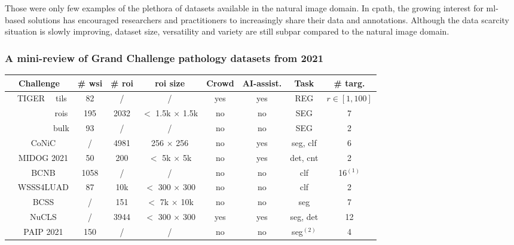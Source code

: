 Those were only few examples of the plethora of datasets available in the natural image domain. In \acrlong{cpath}, the growing interest for \acrshort{ml}-based solutions has encouraged researchers and practitioners to increasingly share their data and annotations. Although the data scarcity situation is slowly improving, dataset size, versatility and variety are still subpar compared to the natural image domain.

\subsubsection{A mini-review of Grand Challenge pathology datasets from 2021}
\label{sssec:backdp:grandchallenge}

\begin{table}
  \centering
  \footnotesize
  \begin{tabular}{|ccc|ccccccc|}
    \hline
    \multicolumn{3}{|c|}{Challenge} & \# \acrshort{wsi} & \# \acrshort{roi} & \acrshort{roi} size & Crowd & AI-assist. & Task & \# targ. \\
    \hline
    \multirow{3}{*}{\cite{vanrijthoven2021tiger}} & \multirow{3}{*}{TIGER} & tils & 82 & / &  / & yes & yes & REG & $r \in \left[1, 100\right]$\\
    & & rois & 195 & 2032 & $<$ 1.5k $\times$ 1.5k & no & no & SEG & 7\\
    & & bulk & 93 & / & / & no & no & SEG & 2 \\
    \hdashline
    \cite{graham2021conic} & \multicolumn{2}{c|}{CoNiC} & / & 4981 & 256 $\times$ 256 & no & yes & \acrshort{seg}, \acrshort{clf} & 6 \\
    \cite{aubreville2021mitosis} & \multicolumn{2}{c|}{MIDOG 2021} & 50 & 200 & $<$ 5k $\times$ 5k & no & yes & \acrshort{det}, \acrshort{cnt} & 2 \\
    \cite{xu2021predicting} & \multicolumn{2}{c|}{BCNB} & 1058 & / & / & no & no & \acrshort{clf} & 16$^{(1)}$ \\
    \cite{han2021multilayer} & \multicolumn{2}{c|}{WSSS4LUAD} & 87 & 10k & $<$ 300 $\times$ 300 & no & no & \acrshort{clf} & 2\\
    \cite{amgad2019structured} & \multicolumn{2}{c|}{BCSS} & / & 151 & $<$ 7k $\times$ 10k & no & no & \acrshort{seg} & 7\\
    \cite{amgad2021nucls} & \multicolumn{2}{c|}{NuCLS} &  / & 3944 & $<$ 300 $\times$ 300 & yes & yes & \acrshort{seg}, \acrshort{det} & 12 \\
    \cite{kang2021paip} & \multicolumn{2}{c|}{PAIP 2021} & 150 & / & / & no & no & \acrshort{seg}$^{(2)}$ & 4 \\

\end{tabular}
\end{table}
